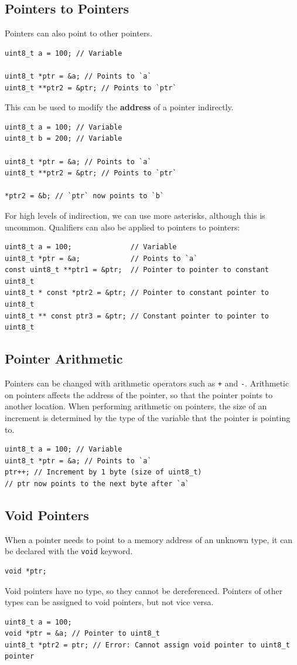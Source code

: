 \documentclass[a4paper]{report}
\begin{document}
\subsection{Pointers to Pointers}
Pointers can also point to other pointers.
\begin{verbatim}
uint8_t a = 100; // Variable

uint8_t *ptr = &a; // Points to `a`
uint8_t **ptr2 = &ptr; // Points to `ptr`
\end{verbatim}
This can be used to modify the \textbf{address} of a pointer indirectly.
\begin{verbatim}
uint8_t a = 100; // Variable
uint8_t b = 200; // Variable

uint8_t *ptr = &a; // Points to `a`
uint8_t **ptr2 = &ptr; // Points to `ptr`

*ptr2 = &b; // `ptr` now points to `b`
\end{verbatim}
For high levels of indirection, we can use more asterisks, although this is uncommon.
Qualifiers can also be applied to pointers to pointers:
\begin{verbatim}
uint8_t a = 100;              // Variable
uint8_t *ptr = &a;            // Points to `a`
const uint8_t **ptr1 = &ptr;  // Pointer to pointer to constant uint8_t
uint8_t * const *ptr2 = &ptr; // Pointer to constant pointer to uint8_t
uint8_t ** const ptr3 = &ptr; // Constant pointer to pointer to uint8_t
\end{verbatim}
\subsection{Pointer Arithmetic}
Pointers can be changed with arithmetic operators such as \texttt{+} and \texttt{-}.
Arithmetic on pointers affects the address of the pointer, so that the pointer points to another location.
When performing arithmetic on pointers, the size of an increment is determined by the type of the variable
that the pointer is pointing to.
\begin{verbatim}
uint8_t a = 100; // Variable
uint8_t *ptr = &a; // Points to `a`
ptr++; // Increment by 1 byte (size of uint8_t)
// ptr now points to the next byte after `a`
\end{verbatim}
\subsection{Void Pointers}
When a pointer needs to point to a memory address of an unknown type, it
can be declared with the \texttt{void} keyword.
\begin{verbatim}
void *ptr;
\end{verbatim}
Void pointers have no type, so they cannot be dereferenced.
Pointers of other types can be assigned to void pointers, but not vice versa.
\begin{verbatim}
uint8_t a = 100;
void *ptr = &a; // Pointer to uint8_t
uint8_t *ptr2 = ptr; // Error: Cannot assign void pointer to uint8_t pointer
\end{verbatim}
\end{document}
